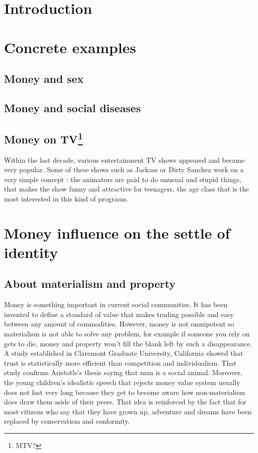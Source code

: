 \section{Introduction}



\section{Concrete examples}

\subsection{Money and sex}



\subsection{Money and social diseases}



\subsection[Money on TV]{Money on TV\footnote{MTV?}}

Within the last decade, various entertainment TV shows appeared and became very popular. Some of these shows such as Jackass 
or Dirty Sanchez work on a very simple concept : the animators are paid to do unusual and stupid things, that makes the show 
funny and attractive for teenagers, the age class that is the most interested in this kind of programs.

\section{Money influence on the settle of identity}

\subsection{About materialism and property}

Money is something important in current social communities. It has been invented to define a standard of value that makes 
trading possible and easy between any amount of commodities. However, money is not omnipotent so materialism is not able to 
solve any problem, for example if someone you rely on gets to die, money and property won't fill the blank left by such a 
disappearance. A study established in Claremont Graduate University, California showed that trust is statistically more 
efficient than competition and individualism. That study confirms Aristotle's thesis saying that man is a social animal. 
Moreover, the young children's idealistic speech that rejects money value system usually does not last very long because 
they get to become aware how non-materialism does draw them aside of their peers. That idea is reinforced by the fact that 
for most citizens who say that they have grown up, adventure and dreams have been replaced by conservatism and conformity.

